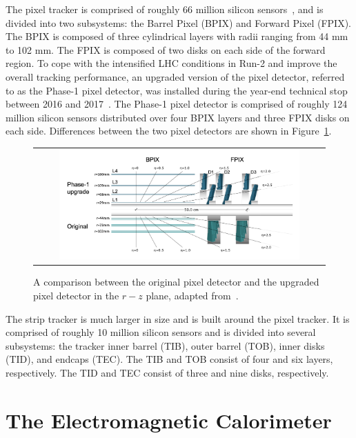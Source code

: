 The pixel tracker is comprised of roughly 66 million silicon sensors~\cite{CMS:2014pgm}, and is divided into two subsystems: the Barrel Pixel (BPIX) and  Forward Pixel (FPIX). The BPIX is composed of three cylindrical layers with radii ranging from 44 mm to 102 mm. The FPIX is composed of two disks on each side of the forward region. To cope with the intensified \ac{LHC} conditions in Run-2 and improve the overall tracking performance, an upgraded version of the pixel detector, referred to as the Phase-1 pixel detector, was installed during the year-end technical stop between 2016 and 2017~\cite{CMSTrackerGroup:2020edz}. The Phase-1 pixel detector is comprised of roughly 124 million silicon sensors distributed over four BPIX layers and three FPIX disks on each side. Differences between the two pixel detectors are shown in Figure~\ref{fig:Pixel}.

\begin{figure}[tbh!]
 \begin{center}
 \begin{tabular}{c}
 \includegraphics[width=0.85\textwidth]{figures/Part2/CMS/Pixel}
 \end{tabular}
 \caption{A comparison between the original pixel detector and the upgraded pixel detector in the $r-z$ plane, adapted from~\cite{CMSTrackerGroup:2020edz}.}
 \label{fig:Pixel}
 \end{center}
\end{figure}

The strip tracker is much larger in size and is built around the pixel tracker. It is comprised of roughly 10 million silicon sensors and is divided into several subsystems: the tracker inner barrel (TIB), outer barrel (TOB), inner disks (TID), and endcaps (TEC). The TIB and TOB consist of four and six layers, respectively. The TID and TEC consist of three and nine disks, respectively.

\section{The Electromagnetic Calorimeter}
\label{sec:ECAL}

